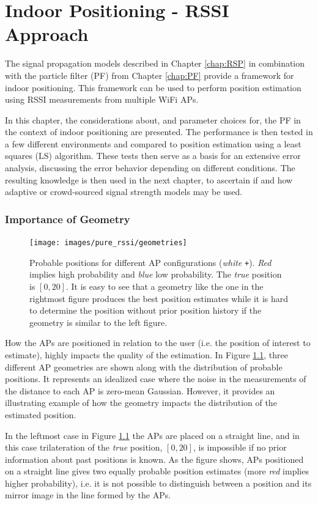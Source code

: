 \documentclass{LTHthesis}
\begin{document}
\chapter{Indoor Positioning - RSSI Approach}
\label{chap:pure_rssi}
%
The signal propagation models described in Chapter \ref{chap:RSP} in combination with the particle filter (PF) from Chapter \ref{chap:PF} provide a framework for indoor positioning. This framework can be used to perform position estimation using RSSI measurements from multiple WiFi APs. 

In this chapter, the considerations about, and parameter choices for, the PF in the context of indoor positioning are presented. The performance is then tested in a few different environments and compared to position estimation using a least squares (LS) algorithm.  These tests then serve as a basis for an extensive error analysis, discussing the error behavior depending on different conditions. The resulting knowledge is then used in the next chapter, to ascertain if and how adaptive or crowd-sourced signal strength models may be used.
%
\subsection{Importance of Geometry}
%
\begin{figure}[!hbt]

\texttt{[image: images/pure\_rssi/geometries]}
\caption{Probable positions for different AP configurations (\emph{white} \texttt{+}). \emph{Red} implies high probability and \emph{blue} low probability. The \emph{true} position is $[0, 20]$. It is easy to see that a geometry like the one in the rightmost figure produces the best position estimates while it is hard to determine the position without prior position history if the geometry is similar to the left figure. }\label{geometries}
\end{figure}
%
How the APs are positioned in relation to the user (i.e. the position of interest to estimate), highly impacts the quality of the estimation. In Figure \ref{geometries}, three different AP geometries are shown along with the distribution of probable positions. It represents an idealized case where the noise in the measurements of the distance to each AP is zero-mean Gaussian. However, it provides an illustrating example of how the geometry impacts the distribution of the estimated position.

In the leftmost case in Figure \ref{geometries} the APs are placed on a straight line, and in this case trilateration of the \emph{true} position, $[0,20]$, is impossible if no prior information about past positions is known. As the figure shows, APs positioned on a straight line gives two equally probable position estimates (more \emph{red} implies higher probability), i.e. it is not possible to distinguish between a position and its mirror image in the line formed by the APs. 
\end{document}
